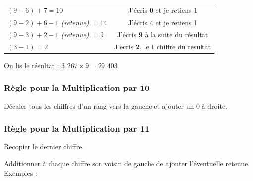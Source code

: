 \documentclass[a4paper, twoside]{article}
\begin{document}
\begin{small}
\begin{enumerate}
\begin{tabular}{l|c}
				\tabularnewline
				
				$(9 - 6) + 7 = 10$ & J'écris \textbf{0} et je retiens 1
				
				\tabularnewline
				
				$(9 - 2) + 6 + 1$ \textit{(retenue)} $= 14$ & J'écris \textbf{4} et je retiens 1
				
				\tabularnewline
				
				$(9 - 3) + 2 + 1$ \textit{(retenue)} $= 9$ & J'écris \textbf{9} à la suite du résultat
				
				\tabularnewline
				
				$(3 - 1) = 2$ & J'écris \textbf{2}, le 1\up{er} chiffre du résultat
				
			\end{tabular}
			
			On lis le résultat : {\boldmath $3$ $267 \times 9 = 29$ $403$}\\	
			
		\end{enumerate}
		\end{small}


		\vfill
		{\noindent \dotfill}


		\subsubsection*{Règle pour la Multiplication par 10}

		Décaler tous les chiffres d'un rang vers la gauche et ajouter un 0 à droite.\\


		\vfill
		{\noindent \dotfill}


		\subsubsection*{Règle pour la Multiplication par 11}

		Recopier le dernier chiffre.

		Additionner à chaque chiffre son voisin de gauche de ajouter l'éventuelle retenue.\\

		{ \parindent=0.5cm Exemples : }
\end{document}
